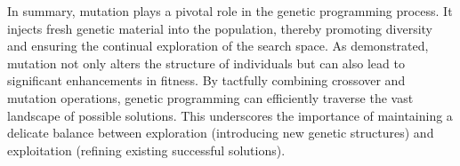  In summary, mutation plays a pivotal role in the genetic programming process.
  It injects fresh genetic material into the population, thereby promoting 
  diversity and ensuring the continual exploration of the search space.
  As demonstrated, mutation not only alters the structure of individuals but can 
  also lead to significant enhancements in fitness.
  By tactfully combining crossover and mutation operations, genetic programming 
  can efficiently traverse the vast landscape of possible solutions.
  This underscores the importance of maintaining a delicate balance between 
  exploration (introducing new genetic structures) and exploitation (refining 
  existing successful solutions).
